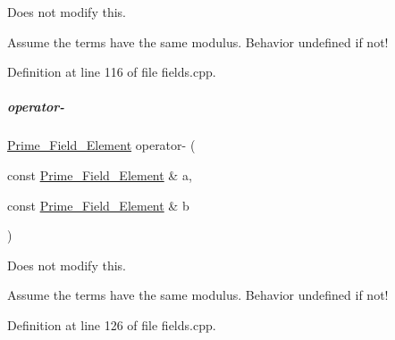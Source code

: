 Does not modify {\ttfamily this}. 

Assume the terms have the same modulus. Behavior undefined if not! 

Definition at line 116 of file fields.\+cpp.

\mbox{\label{group___fields_group_aa87409f200d39343529ab443cd496b31}} 
\subparagraph{\texorpdfstring{operator-\/}{operator-}}
{\footnotesize\ttfamily \hyperlink{group___fields_group_class_prime___field___element}{Prime\+\_\+\+Field\+\_\+\+Element} operator-\/ (\begin{DoxyParamCaption}\item[{const \hyperlink{group___fields_group_class_prime___field___element}{Prime\+\_\+\+Field\+\_\+\+Element} \&}]{a,  }\item[{const \hyperlink{group___fields_group_class_prime___field___element}{Prime\+\_\+\+Field\+\_\+\+Element} \&}]{b }\end{DoxyParamCaption})\hspace{0.3cm}{\ttfamily [friend]}}



Does not modify {\ttfamily this}. 

Assume the terms have the same modulus. Behavior undefined if not! 

Definition at line 126 of file fields.\+cpp.

